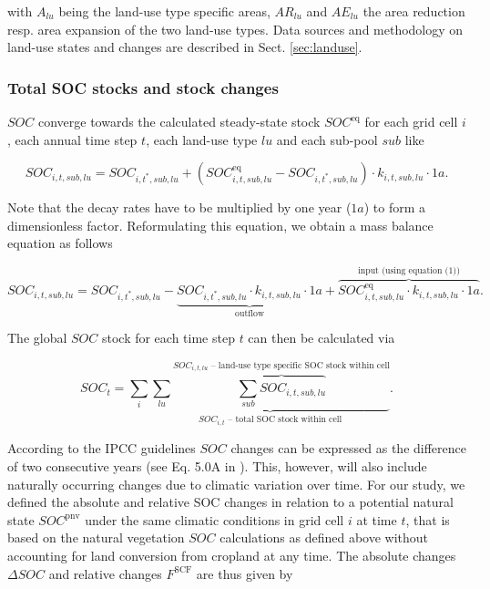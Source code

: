 \documentclass[gc, manuscript]{copernicus}
\begin{document}
with \(A_{lu}\) being the land-use type specific areas, \(AR_{lu}\) and \(AE_{lu}\) the area reduction resp. area expansion of the two land-use types. Data sources and methodology on land-use states and changes are described in Sect. \ref{sec:landuse}.

\hypertarget{sec:totalsoc}{%
\subsubsection{Total SOC stocks and stock changes}\label{sec:totalsoc}}

\(SOC\) converge towards the calculated steady-state stock \(SOC^{\mathrm{eq}}\) for each grid cell \(i\), each annual time step \(t\), each land-use type \(lu\) and each sub-pool \(sub\) like

\begin{equation}
SOC_{i,t,sub,lu} = SOC_{i,t^*,sub,lu} + (SOC^{\mathrm{eq}}_{i,t,sub,lu} - SOC_{i,t^*,sub,lu}) \cdot k_{i,t,sub,lu} \cdot 1\unit{a}.
\label{eq:SOCstate}
\end{equation}

Note that the decay rates have to be multiplied by one year (\(1a\)) to form a dimensionless factor.
Reformulating this equation, we obtain a mass balance equation as follows

\begin{equation}
SOC_{i,t,sub,lu} = SOC_{i,t^*,sub,lu} - \underbrace{SOC_{i,t^*,sub,lu} \cdot k_{i,t,sub,lu} \cdot 1\unit{a}}_{\text{outflow}} + \overbrace{SOC^{\mathrm{eq}}_{i,t,sub,lu} \cdot k_{i,t,sub,lu} \cdot 1\unit{a}}^{\text{input (using equation (1))}}.
\label{eq:steadystate2budget}
\end{equation}

The global \(SOC\) stock for each time step \(t\) can then be calculated via

\begin{equation}
SOC_{t} = \sum_{i} \underbrace{\sum_{lu} \overbrace{\sum_{sub} SOC_{i,t,sub,lu}}^{\text{$SOC_{i,t,lu}$ -- land-use type specific SOC stock within cell}}}_{\text{$SOC_{i,t}$ -- total SOC stock within cell}}.
\label{eq:totalstock}
\end{equation}

According to the IPCC guidelines \(SOC\) changes can be expressed as the difference of two consecutive years (see Eq. 5.0A in \citep{calvo_buendia_ipcc_2019}). This, however, will also include naturally occurring changes due to climatic variation over time. For our study, we defined the absolute and relative SOC changes in relation to a potential natural state \(SOC^{\mathrm{pnv}}\) under the same climatic conditions in grid cell \(i\) at time \(t\), that is based on the natural vegetation \(SOC\) calculations as defined above without accounting for land conversion from cropland at any time. The absolute changes \(\Delta SOC\) and relative changes \(F^{\mathrm{SCF}}\) are thus given by
\end{document}
